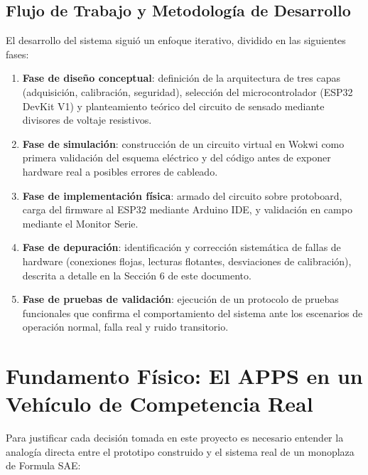 \documentclass[12pt, letterpaper]{article}
\begin{document}
	\subsection{Flujo de Trabajo y Metodología de Desarrollo}
	El desarrollo del sistema siguió un enfoque iterativo, dividido en las siguientes fases:
	\begin{enumerate}
		\item \textbf{Fase de diseño conceptual}: definición de la arquitectura de tres capas (adquisición, calibración, seguridad), selección del microcontrolador (ESP32 DevKit V1) y planteamiento teórico del circuito de sensado mediante divisores de voltaje resistivos.
		\item \textbf{Fase de simulación}: construcción de un circuito virtual en Wokwi como primera validación del esquema eléctrico y del código antes de exponer hardware real a posibles errores de cableado.
		\item \textbf{Fase de implementación física}: armado del circuito sobre protoboard, carga del firmware al ESP32 mediante Arduino IDE, y validación en campo mediante el Monitor Serie.
		\item \textbf{Fase de depuración}: identificación y corrección sistemática de fallas de hardware (conexiones flojas, lecturas flotantes, desviaciones de calibración), descrita a detalle en la Sección 6 de este documento.
		\item \textbf{Fase de pruebas de validación}: ejecución de un protocolo de pruebas funcionales que confirma el comportamiento del sistema ante los escenarios de operación normal, falla real y ruido transitorio.
	\end{enumerate}
	
	\section{Fundamento Físico: El APPS en un Vehículo de Competencia Real}
	Para justificar cada decisión tomada en este proyecto es necesario entender la analogía directa entre el prototipo construido y el sistema real de un monoplaza de Formula SAE:
	
\end{document}
